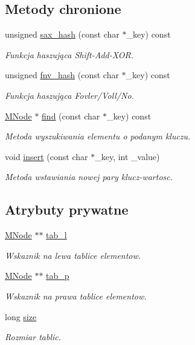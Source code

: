 \subsection*{Metody chronione}
\begin{DoxyCompactItemize}
\item 
unsigned \hyperlink{class_mieszajaca_aebebbfdbc3aaf674aaebe310875e4421}{sax\-\_\-hash} (const char $\ast$\-\_\-key) const 
\begin{DoxyCompactList}\small\item\em Funkcja haszująca Shift-\/\-Add-\/\-X\-O\-R. \end{DoxyCompactList}\item 
unsigned \hyperlink{class_mieszajaca_a642b6f2a8dde05a27c885ccc38ca67cf}{fnv\-\_\-hash} (const char $\ast$\-\_\-key) const 
\begin{DoxyCompactList}\small\item\em Funkcja haszująca Fovler/\-Voll/\-No. \end{DoxyCompactList}\item 
\hyperlink{struct_m_node}{M\-Node} $\ast$ \hyperlink{class_mieszajaca_a93313aff6572c4aeddd163ad73def59b}{find} (const char $\ast$\-\_\-key) const 
\begin{DoxyCompactList}\small\item\em Metoda wyszukiwania elementu o podanym kluczu. \end{DoxyCompactList}\item 
void \hyperlink{class_mieszajaca_a849e083a7f131a58f0b0ad55cd3d3f66}{insert} (const char $\ast$\-\_\-key, int \-\_\-value)
\begin{DoxyCompactList}\small\item\em Metoda wstawiania nowej pary klucz-\/wartosc. \end{DoxyCompactList}\end{DoxyCompactItemize}
\subsection*{Atrybuty prywatne}
\begin{DoxyCompactItemize}
\item 
\hyperlink{struct_m_node}{M\-Node} $\ast$$\ast$ \hyperlink{class_mieszajaca_adb0f4884ed63b184cf0bd63e757490cd}{tab\-\_\-l}
\begin{DoxyCompactList}\small\item\em Wskaznik na lewa tablice elementow. \end{DoxyCompactList}\item 
\hyperlink{struct_m_node}{M\-Node} $\ast$$\ast$ \hyperlink{class_mieszajaca_a37e86d776d7eeef64b36f04e91b44a4c}{tab\-\_\-p}
\begin{DoxyCompactList}\small\item\em Wskaznik na prawa tablice elementow. \end{DoxyCompactList}\item 
long \hyperlink{class_mieszajaca_a6521d97bf16d4fd92d147aafd2a56e3f}{size}
\begin{DoxyCompactList}\small\item\em Rozmiar tablic. \end{DoxyCompactList}\end{DoxyCompactItemize}
